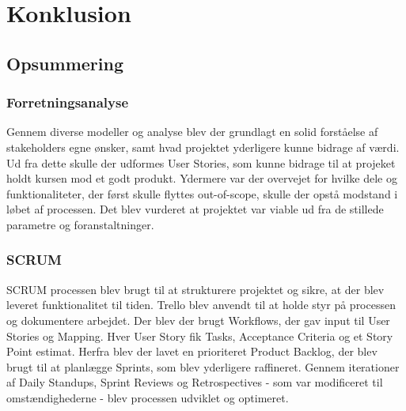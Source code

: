 \chapter{Konklusion}
\label{chapter:conclusion}

\section{Opsummering}
\label{sec:conclusion_summary}

\subsection{Forretningsanalyse}
Gennem diverse modeller og analyse blev der grundlagt en solid forståelse af stakeholders egne ønsker, samt hvad projektet yderligere kunne bidrage af værdi. 
Ud fra dette skulle der udformes User Stories, som kunne bidrage til at projeket holdt kursen mod et godt produkt. 
Ydermere var der overvejet for hvilke dele og funktionaliteter, der først skulle flyttes out-of-scope, skulle der opstå modstand i løbet af processen.
Det blev vurderet at projektet var viable ud fra de stillede parametre og foranstaltninger. 

\subsection{SCRUM}
SCRUM processen blev brugt til at strukturere projektet og sikre, at der blev leveret funktionalitet til tiden.
Trello blev anvendt til at holde styr på processen og dokumentere arbejdet.
Der blev der brugt Workflows, der gav input til User Stories og Mapping. Hver User Story fik Tasks, Acceptance Criteria og et Story Point estimat.
Herfra blev der lavet en prioriteret Product Backlog, der blev brugt til at planlægge Sprints, som blev yderligere raffineret.
Gennem iterationer af Daily Standups, Sprint Reviews og Retrospectives - som var modificeret til omstændighederne - blev processen udviklet og optimeret.

